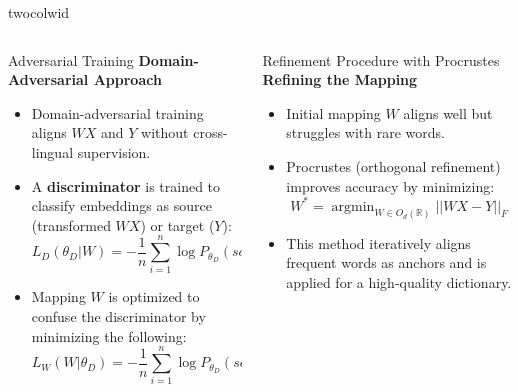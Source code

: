 \documentclass[final]{beamer}
\newlength{\onecolwid}
\newlength{\twocolwid}
\DeclareMathOperator*{\argmin}{argmin}
\begin{document}
\begin{frame}[t]
\begin{columns}[t]
\begin{column}{twocolwid}
\begin{columns}[t,totalwidth=\twocolwid]
\begin{column}{\onecolwid}
\begin{block}{Adversarial Training}
    \textbf{Domain-Adversarial Approach}
    \begin{itemize}
        \item Domain-adversarial training aligns \( WX \) and \( Y \) without cross-lingual supervision.
        \item A \textbf{discriminator} is trained to classify embeddings as source (transformed \( WX \)) or target (\( Y \)):
        \begin{equation}
            L_D(\theta_D | W) = - \frac{1}{n} \sum_{i=1}^n \log P_{\theta_D}(source = 1 | W x_i) - \frac{1}{m} \sum_{i=1}^m \log P_{\theta_D}(source = 0 | y_i)
        \end{equation}
        \item Mapping \( W \) is optimized to confuse the discriminator by minimizing the following:
        \begin{equation}
            L_W(W | \theta_D) = - \frac{1}{n} \sum_{i=1}^n \log P_{\theta_D}(source = 0 | W x_i) - \frac{1}{m} \sum_{i=1}^m \log P_{\theta_D}(source = 1 | y_i)
        \end{equation}
    \end{itemize}
\end{block}

\end{column}

\begin{column}{\onecolwid}


\begin{block}{Refinement Procedure with Procrustes}
    \textbf{Refining the Mapping}
    \begin{itemize}
        \item Initial mapping \( W \) aligns well but struggles with rare words.
        \item Procrustes (orthogonal refinement) improves accuracy by minimizing:
        \begin{equation}
            W^* = \argmin_{W \in O_d(\mathbb{R})} || W X - Y ||_F
        \end{equation}
        \item This method iteratively aligns frequent words as anchors and is applied for a high-quality dictionary.
    \end{itemize}
\end{block}


\end{column}
\end{columns}
\end{column}
\end{columns}
\end{frame}
\end{document}
